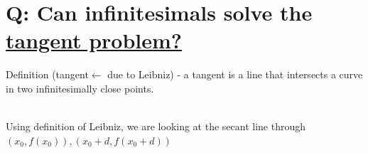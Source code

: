 \documentclass[a4paper, 12pt]{article}
\begin{document}
\section{Q: Can infinitesimals solve the \underline{tangent problem?}}
Definition (tangent$\leftarrow$ due to Leibniz) - a tangent is a line that intersects a curve in two infinitesimally close points.
\begin{multicols}{2}
\begin{centering}
\\
Using definition of Leibniz, we are looking at the secant line through $(x_0,f(x_0)),(x_0+d,f(x_0+d))$
\end{centering}
\end{multicols}
\end{document}
